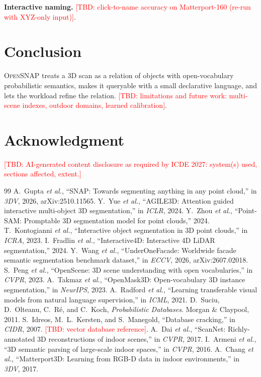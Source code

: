 \documentclass[conference]{IEEEtran}
\newcommand{\TBD}[1]{\textcolor{red}{[TBD: #1]}}
\newcommand{\sys}{\textsc{OpenSNAP}}
\begin{document}
\textbf{Interactive naming.} \TBD{click-to-name accuracy on Matterport-160 (re-run with XYZ-only input)}.

\section{Conclusion}
\sys{} treats a 3D scan as a relation of objects with open-vocabulary probabilistic semantics, makes it queryable with
a small declarative language, and lets the workload refine the relation. \TBD{limitations and future work: multi-scene
indexes, outdoor domains, learned calibration}.

\section*{Acknowledgment}
\TBD{AI-generated content disclosure as required by ICDE 2027: system(s) used, sections affected, extent.}


\begin{thebibliography}{99}
 A.~Gupta \emph{et al.}, ``SNAP: Towards segmenting anything in any point cloud,'' in \emph{3DV}, 2026, arXiv:2510.11565.
 Y.~Yue \emph{et al.}, ``AGILE3D: Attention guided interactive multi-object 3D segmentation,'' in \emph{ICLR}, 2024.
 Y.~Zhou \emph{et al.}, ``Point-SAM: Promptable 3D segmentation model for point clouds,'' 2024.
 T.~Kontogianni \emph{et al.}, ``Interactive object segmentation in 3D point clouds,'' in \emph{ICRA}, 2023.
 I.~Fradlin \emph{et al.}, ``Interactive4D: Interactive 4D LiDAR segmentation,'' 2024.
 Y.~Wang \emph{et al.}, ``UnderOneFacade: Worldwide facade semantic segmentation benchmark
dataset,'' in \emph{ECCV}, 2026, arXiv:2607.02018.
 S.~Peng \emph{et al.}, ``OpenScene: 3D scene understanding with open vocabularies,'' in \emph{CVPR}, 2023.
 A.~Takmaz \emph{et al.}, ``OpenMask3D: Open-vocabulary 3D instance segmentation,'' in \emph{NeurIPS}, 2023.
 A.~Radford \emph{et al.}, ``Learning transferable visual models from natural language supervision,'' in \emph{ICML}, 2021.
 D.~Suciu, D.~Olteanu, C.~R\'e, and C.~Koch, \emph{Probabilistic Databases}. Morgan \& Claypool, 2011.
 S.~Idreos, M.~L.~Kersten, and S.~Manegold, ``Database cracking,'' in \emph{CIDR}, 2007.
 \TBD{vector database reference}.
 A.~Dai \emph{et al.}, ``ScanNet: Richly-annotated 3D reconstructions of indoor scenes,'' in \emph{CVPR}, 2017.
 I.~Armeni \emph{et al.}, ``3D semantic parsing of large-scale indoor spaces,'' in \emph{CVPR}, 2016.
 A.~Chang \emph{et al.}, ``Matterport3D: Learning from RGB-D data in indoor environments,'' in \emph{3DV}, 2017.
\end{thebibliography}
\end{document}
